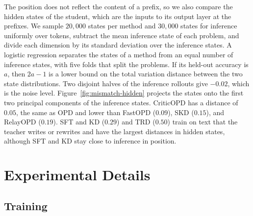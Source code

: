 The position does not reflect the content of a prefix, so we also compare the hidden states of the student, which are the inputs to its output layer at the prefixes.
We sample $20{,}000$ states per method and $30{,}000$ states for inference uniformly over tokens, subtract the mean inference state of each problem, and divide each dimension by its standard deviation over the inference states.
A logistic regression separates the states of a method from an equal number of inference states, with five folds that split the problems.
If its held-out accuracy is $a$, then $2a-1$ is a lower bound on the total variation distance between the two state distributions.
Two disjoint halves of the inference rollouts give $-0.02$, which is the noise level.
Figure~\ref{fig:mismatch-hidden} projects the states onto the first two principal components of the inference states.
CriticOPD has a distance of $0.05$, the same as OPD and lower than FastOPD ($0.09$), SKD ($0.15$), and RelayOPD ($0.19$).
SFT and KD ($0.29$) and TRD ($0.50$) train on text that the teacher writes or rewrites and have the largest distances in hidden states, although SFT and KD stay close to inference in position.

\section{Experimental Details}
\label{app:setup}

\subsection{Training}

